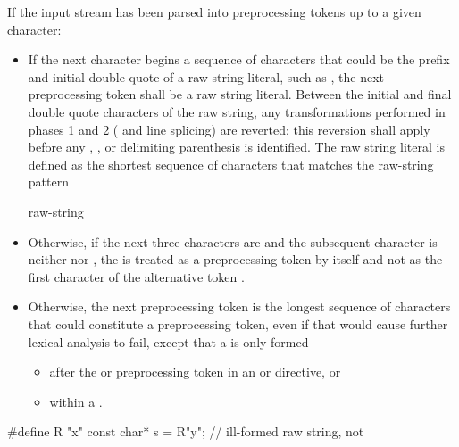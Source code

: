 \pnum
If the input stream has been parsed into preprocessing tokens up to a
given character:
\begin{itemize}
\item
{}%
If the next character begins a sequence of characters that could be the prefix
and initial double quote of a raw string literal, such as , the next preprocessing
token shall be a raw string literal. Between the initial and final
double quote characters of the raw string, any transformations performed in phases
1 and 2 ( and line splicing) are reverted; this reversion
shall apply before any , , or delimiting
parenthesis is identified. The raw string literal is defined as the shortest sequence
of characters that matches the raw-string pattern
\begin{ncbnf}
  raw-string
\end{ncbnf}

\item Otherwise, if the next three characters are \tcode{<::} and the subsequent character
is neither \tcode{:} nor \tcode{>}, the \tcode{<} is treated as a preprocessing token by
itself and not as the first character of the alternative token \tcode{<:}.

\item Otherwise,
the next preprocessing token is the longest sequence of
characters that could constitute a preprocessing token, even if that
would cause further lexical analysis to fail,
except that a  is only formed
\begin{itemize}
\item
after the  or  preprocessing token in an
 or
 directive, or

\item
within a .

\end{itemize}
\end{itemize}

\begin{example}
\begin{codeblock}
#define R "x"
const char* s = R"y";           // ill-formed raw string, not 
\end{codeblock}
\end{example}

